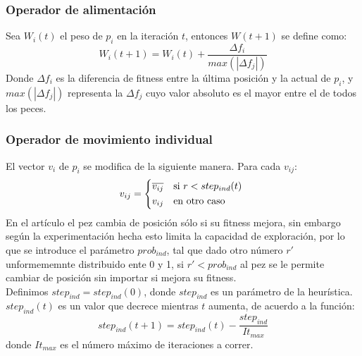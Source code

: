 \documentclass[12pt]{article}
\begin{document}
\subsubsection{Operador de alimentación}
Sea $W_i(t)$ el peso de $p_i$ en la iteración $t$, entonces $W(t + 1)$ se define como:
\begin{equation*}
  W_i(t + 1) = W_i(t) + \frac{\Delta f_i}{max(|\Delta f_j|)}
\end{equation*}
Donde $\Delta f_i$ es la diferencia de fitness entre la última posición y la actual de $p_i$, y $max(|\Delta f_j|)$ representa la $\Delta f_j$ cuyo valor absoluto es el mayor entre el de todos los peces.

\subsubsection{Operador de movimiento individual}
El vector $v_i$ de $p_i$ se modifica de la siguiente manera. Para cada $v_{ij}$:
\begin{equation*}
  v_{ij} =
  \begin{cases*}
    \overline{v_{ij}} & si $r < step_{ind}(t)$ \\
    v_{ij} & en otro caso 
  \end{cases*}
\end{equation*}
En el artículo el pez cambia de posición sólo si su fitness mejora, sin embargo según la experimentación hecha esto limita la capacidad de exploración, por lo que se introduce el parámetro $prob_{ind}$, tal que dado otro número $r'$ unformememnte distribuido ente 0 y 1, si $r' < prob_{ind}$ al pez se le permite cambiar de posición sin importar si mejora su fitness. \\

Definimos $step_{ind} = step_{ind}(0)$, donde $step_{ind}$ es un parámetro de la heurística. $step_{ind}(t)$ es un valor que decrece mientras $t$ aumenta, de acuerdo a la función:
\begin{equation*}
  step_{ind}(t + 1) = step_{ind}(t) - \frac{step_{ind}}{It_{max}}
\end{equation*}
donde $It_{max}$ es el número máximo de iteraciones a correr.
\end{document}

